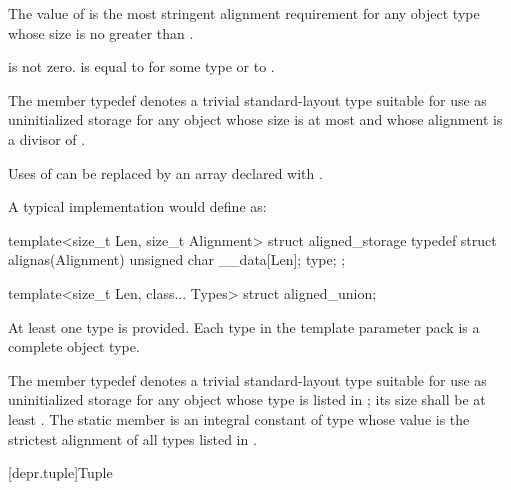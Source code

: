 \begin{itemdescr}
\pnum
The value of  is the most
stringent alignment requirement for any object type whose size
is no greater than .

\pnum
\mandates
{} is not zero.
 is equal to  for some type  or
to .

\pnum
The member typedef  denotes a trivial standard-layout type
suitable for use as uninitialized storage for any object
whose size is at most  and
whose alignment is a divisor of .

\pnum
\begin{note}
Uses of  can be replaced
by an array  declared with .
\end{note}

\pnum
\begin{note}
A typical implementation would define  as:
\begin{codeblock}
template<size_t Len, size_t Alignment>
struct aligned_storage {
  typedef struct {
    alignas(Alignment) unsigned char __data[Len];
  } type;
};
\end{codeblock}
\end{note}

\end{itemdescr}

%
\begin{itemdecl}
template<size_t Len, class... Types>
  struct aligned_union;
\end{itemdecl}

\begin{itemdescr}
\pnum
\mandates
At least one type is provided.
Each type in the template parameter pack 
is a complete object type.

\pnum
The member typedef  denotes a trivial standard-layout type
suitable for use as uninitialized storage for any object
whose type is listed in ;
its size shall be at least .
The static member 
is an integral constant of type 
whose value is the strictest alignment of all types listed in .
\end{itemdescr}

[depr.tuple]{Tuple}

